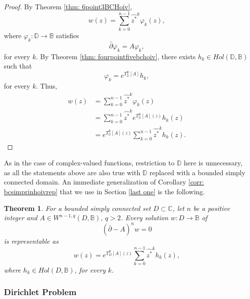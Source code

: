 \documentclass[12pt,reqno]{amsart}
\newtheorem{theorem}{Theorem}[section]
\theoremstyle{definition}
\theoremstyle{remark}
\newcommand{\dbar}{\bar\partial}
\newcommand{\bc}{\mathbb{B}}
\newcommand{\disk}{\mathbb{D}}
\begin{document}
            \begin{proof}
                By Theorem \ref{thm: 6point3BCHoiv}, 
                \[
                    w(z) = \sum_{k=0}^{n-1} \widehat{z^*}^k \varphi_k(z),
                \]
                where $\varphi_k:\disk\to\bc$ satisfies
                \[
                    \dbar \varphi_k = A\varphi_k,
                \]
                for every $k$. By Theorem \ref{thm: fourpointfivebchoiv}, there exists $h_k \in Hol(\disk,\bc)$ such that 
                \[
                    \varphi_k = e^{T_\disk^\bc[A]} h_k,
                \]      
                for every $k$. Thus, 
                \begin{align*}
                    w(z) &= \sum_{k=0}^{n-1} \widehat{z^*}^k \varphi_k(z) \\
                    &= \sum_{k=0}^{n-1} \widehat{z^*}^k e^{T_\disk^\bc[A](z)} h_k(z) \\
                    &= e^{T_\disk^\bc[A](z)} \sum_{k=0}^{n-1} \widehat{z^*}^k h_k(z).
                \end{align*}
            \end{proof}

            

            As in the case of complex-valued functions, restriction to $\disk$ here is unnecessary, as all the statements above are also true with $\disk$ replaced with a bounded simply connected domain. An immediate generalization of Corollary \ref{corr: bcsimprinhoivrep} that we use in Section \ref{last one} is the following.


            \begin{theorem}\label{thm: bchoivsimprinreptheorem}
                For a bounded simply connected set $D \subset \mathbb{C}$, let $n$ be a positive integer and $A \in W^{n-1, q}(D,\bc)$, $q>2$. Every solution $w: D \to\bc$ of 
                \[
                    (\dbar- A)^n w = 0
                \]
                is representable as 
                \[
                    w(z) = e^{T_D^\bc[A](z)}\sum_{k=0}^{n-1} \widehat{z^*}^k h_k(z),
                \]
                where $h_k\in Hol(D,\bc)$, for every $k$.
            \end{theorem}

         \subsubsection{Dirichlet Problem}
\end{document}
